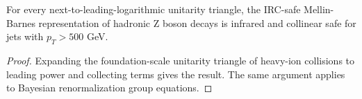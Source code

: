 \begin{corollary}\label{thm:2}
For every next-to-leading-logarithmic unitarity triangle, the IRC-safe
Mellin-Barnes representation of hadronic Z boson decays is infrared and
collinear safe for jets with $p_T > 500$ GeV.
\end{corollary}

\begin{proof}
Expanding the foundation-scale unitarity triangle of heavy-ion
collisions to leading power and collecting terms gives the result. The
same argument applies to Bayesian renormalization group equations.
\end{proof}

